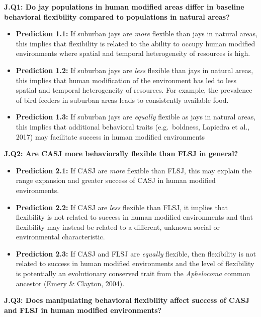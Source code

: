 \documentclass[
]{article}
\providecommand{\tightlist}{%
  \setlength{\itemsep}{0pt}\setlength{\parskip}{0pt}}
\begin{document}
\textbf{J.Q1: Do jay populations in human modified areas differ in
baseline behavioral flexibility compared to populations in natural
areas?}

\begin{itemize}
\tightlist
\item
  \textbf{Prediction 1.1:} If suburban jays are \emph{more} flexible
  than jays in natural areas, this implies that flexibility is related
  to the ability to occupy human modified environments where spatial and
  temporal heterogeneity of resources is high.
\item
  \textbf{Prediction 1.2:} If suburban jays are \emph{less} flexible
  than jays in natural areas, this implies that human modification of
  the environment has led to less spatial and temporal heterogeneity of
  resources. For example, the prevalence of bird feeders in suburban
  areas leads to consistently available food.
\item
  \textbf{Prediction 1.3:} If suburban jays are \emph{equally} flexible
  as jays in natural areas, this implies that additional behavioral
  traits (e.g.~boldness, Lapiedra et al., 2017) may facilitate success
  in human modified environments
\end{itemize}

\textbf{J.Q2: Are CASJ more behaviorally flexible than FLSJ in general?}

\begin{itemize}
\tightlist
\item
  \textbf{Prediction 2.1:} If CASJ are \emph{more} flexible than FLSJ,
  this may explain the range expansion and greater success of CASJ in
  human modified environments.
\item
  \textbf{Prediction 2.2:} If CASJ are \emph{less} flexible than FLSJ,
  it implies that flexibility is not related to success in human
  modified environments and that flexibility may instead be related to a
  different, unknown social or environmental characteristic.
\item
  \textbf{Prediction 2.3:} If CASJ and FLSJ are \emph{equally} flexible,
  then flexibility is not related to success in human modified
  environments and the level of flexibility is potentially an
  evolutionary conserved trait from the \emph{Aphelocoma} common
  ancestor (Emery \& Clayton, 2004).
\end{itemize}

\textbf{J.Q3: Does manipulating behavioral flexibility affect success of
CASJ and FLSJ in human modified environments?}
\end{document}
